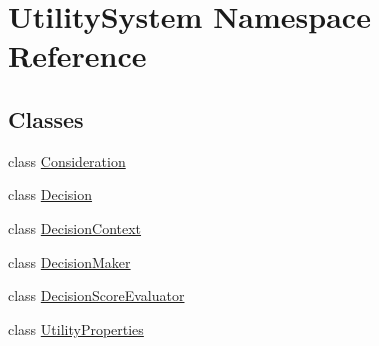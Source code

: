 \hypertarget{namespace_utility_system}{}\section{Utility\+System Namespace Reference}
\label{namespace_utility_system}
\subsection*{Classes}
\begin{DoxyCompactItemize}
\item 
class \mbox{\hyperlink{class_utility_system_1_1_consideration}{Consideration}}
\item 
class \mbox{\hyperlink{class_utility_system_1_1_decision}{Decision}}
\item 
class \mbox{\hyperlink{class_utility_system_1_1_decision_context}{Decision\+Context}}
\item 
class \mbox{\hyperlink{class_utility_system_1_1_decision_maker}{Decision\+Maker}}
\item 
class \mbox{\hyperlink{class_utility_system_1_1_decision_score_evaluator}{Decision\+Score\+Evaluator}}
\item 
class \mbox{\hyperlink{class_utility_system_1_1_utility_properties}{Utility\+Properties}}
\end{DoxyCompactItemize}
